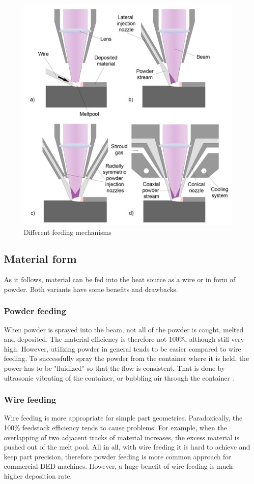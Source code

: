 \documentclass[a4paper, twoside, 11pt]{report}
\begin{document}
\begin{figure}[b!]
	\centering
	\includegraphics[scale=0.8]{DEDnozzles}
	\caption{Different feeding mechanisms \cite{engineering}}
\end{figure}

\subsection{Material form}
As it follows, material can be fed into the heat source as a wire or in form of powder. Both variants have some benefits and drawbacks.
\subsubsection{Powder feeding}
When powder is sprayed into the beam, not all of the powder is caught, melted and deposited. The material efficiency is therefore not 100\%, although still very high. However, utilizing powder in general tends to be easier compared to wire feeding. To successfully spray the powder from the container where it is held, the power has to be "fluidized" so that the flow is consistent. That is done by ultrasonic vibrating of the container, or bubbling air through the container \cite[p. 251]{AMT}.
\subsubsection{Wire feeding}
Wire feeding is more appropriate for simple part geometries. Paradoxically, the 100\% feedstock efficiency tends to cause problems. For example, when the overlapping of two adjacent tracks of material increases, the excess material is pushed out of the melt pool. All in all, with wire feeding it is hard to achieve and keep part precision, therefore powder feeding is more common approach for commercial DED machines. However, a huge benefit of wire feeding is much higher deposition rate.
\end{document}
